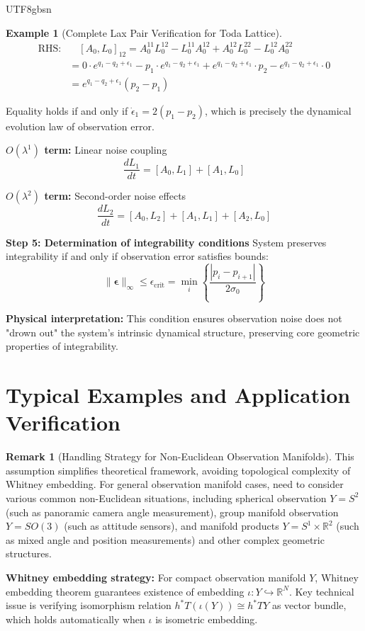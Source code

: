 \documentclass[a4paper,12pt]{extarticle}
\theoremstyle{definition}
\newtheorem{example}{Example}
\newtheorem{remark}{Remark}
\begin{document}
\begin{CJK}{UTF8}{gbsn}
\begin{example}[Complete Lax Pair Verification for Toda Lattice]
\begin{align*}
\text{RHS}: &\quad [A_0, L_0]_{12} = A_0^{11}L_0^{12} - L_0^{11}A_0^{12} + A_0^{12}L_0^{22} - L_0^{12}A_0^{22} \\
&= 0 \cdot e^{q_1-q_2+\epsilon_1} - p_1 \cdot e^{q_1-q_2+\epsilon_1} + e^{q_1-q_2+\epsilon_1} \cdot p_2 - e^{q_1-q_2+\epsilon_1} \cdot 0 \\
&= e^{q_1-q_2+\epsilon_1}(p_2 - p_1)
\end{align*}

Equality holds if and only if $\dot{\epsilon}_1 = 2(p_1 - p_2)$, which is precisely the dynamical evolution law of observation error.

\textbf{$O(\lambda^1)$ term:} Linear noise coupling
$$\frac{dL_1}{dt} = [A_0, L_1] + [A_1, L_0]$$

\textbf{$O(\lambda^2)$ term:} Second-order noise effects
$$\frac{dL_2}{dt} = [A_0, L_2] + [A_1, L_1] + [A_2, L_0]$$

\textbf{Step 5: Determination of integrability conditions}
System preserves integrability if and only if observation error satisfies bounds:
$$\|\boldsymbol{\epsilon}\|_\infty \leq \epsilon_{\text{crit}} = \min_i \left\{\frac{|p_i - p_{i+1}|}{2\sigma_0}\right\}$$

\textbf{Physical interpretation:} This condition ensures observation noise does not "drown out" the system's intrinsic dynamical structure, preserving core geometric properties of integrability.
\end{example}

\section{Typical Examples and Application Verification}

\begin{remark}[Handling Strategy for Non-Euclidean Observation Manifolds]
This assumption simplifies theoretical framework, avoiding topological complexity of Whitney embedding. For general observation manifold cases, need to consider various common non-Euclidean situations, including spherical observation $Y = S^2$ (such as panoramic camera angle measurement), group manifold observation $Y = SO(3)$ (such as attitude sensors), and manifold products $Y = S^1 \times \mathbb{R}^2$ (such as mixed angle and position measurements) and other complex geometric structures.

\textbf{Whitney embedding strategy:} For compact observation manifold $Y$, Whitney embedding theorem guarantees existence of embedding $\iota: Y \hookrightarrow \mathbb{R}^N$. Key technical issue is verifying isomorphism relation $h^*T(\iota(Y)) \cong h^*TY$ as vector bundle, which holds automatically when $\iota$ is isometric embedding.


\end{remark}
\end{CJK}
\end{document}
